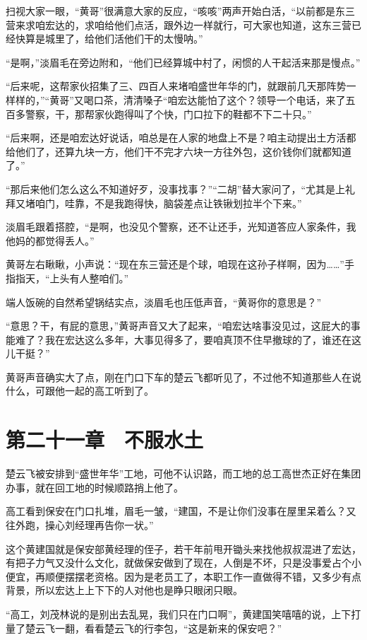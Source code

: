 扫视大家一眼，“黄哥”很满意大家的反应，“咳咳”两声开始白活，“以前都是东三营来求咱宏达的，求咱给他们点活，跟外边一样就行，可大家也知道，这东三营已经快算是城里了，给他们活他们干的太慢呐。”

“是啊，”淡眉毛在旁边附和，“他们已经算城中村了，闲惯的人干起活来那是慢点。”

“后来呢，这帮家伙招集了三、四百人来堵咱盛世年华的门，就跟前几天那阵势一样样的，”“黄哥”又喝口茶，清清嗓子“咱宏达能怕了这个？领导一个电话，来了五百多警察，干，那帮家伙跑得叫了个快，门口拉下的鞋都不下二十只。”

“后来啊，还是咱宏达好说话，咱总是在人家的地盘上不是？咱主动提出土方活都给他们了，还算九块一方，他们干不完才六块一方往外包，这价钱你们就都知道了。”

“那后来他们怎么这么不知道好歹，没事找事？”“二胡”替大家问了，“尤其是上礼拜又堵咱门，哇靠，不是我跑得快，脑袋差点让铁锹划拉半个下来。”

淡眉毛跟着搭腔，“是啊，也没见个警察，还不让还手，光知道答应人家条件，我他妈的都觉得丢人。”

黄哥左右瞅瞅，小声说：“现在东三营还是个球，咱现在这孙子样啊，因为……”手指指天，“上头有人整咱们。”

端人饭碗的自然希望锅结实点，淡眉毛也压低声音，“黄哥你的意思是？”

“意思？干，有屁的意思，”黄哥声音又大了起来，“咱宏达啥事没见过，这屁大的事能难了？我在宏达这么多年，大事见得多了，要咱真顶不住早撤球的了，谁还在这儿干挺？”

黄哥声音确实大了点，刚在门口下车的楚云飞都听见了，不过他不知道那些人在说什么，可跟他一起的高工听到了。

\section{第二十一章　不服水土}

楚云飞被安排到“盛世年华”工地，可他不认识路，而工地的总工高世杰正好在集团办事，就在回工地的时候顺路捎上他了。

高工看到保安在门口扎堆，眉毛一皱，“建国，不是让你们没事在屋里呆着么？又往外跑，操心刘经理再告你一状。”

这个黄建国就是保安部黄经理的侄子，若干年前甩开锄头来找他叔叔混进了宏达，有把子力气又没什么文化，就做保安做到了现在，人倒是不坏，只是没事爱占个小便宜，再顺便摆摆老资格。因为是老员工了，本职工作一直做得不错，又多少有点背景，所以宏达上上下下的人对他也是睁只眼闭只眼。

“高工，刘茂林说的是别出去乱晃，我们只在门口啊”，黄建国笑嘻嘻的说，上下打量了楚云飞一翻，看看楚云飞的行李包，“这是新来的保安吧？”

